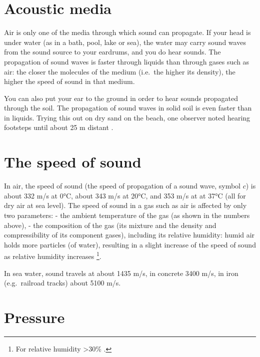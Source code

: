 \documentclass[
]{book}
\begin{document}
\section{Acoustic media}\label{acoustic-media}

Air is only one of the media through which sound can propagate. If your head is under water (as in a bath, pool, lake or sea), the water may carry sound waves from the sound source to your eardrums, and you do hear sounds. The propagation of sound waves is faster through liquids than through gases such as air: the closer the molecules of the medium (i.e.~the higher its density), the higher the speed of sound in that medium.

You can also put your ear to the ground in order to hear sounds propagated through the soil. The propagation of sound waves in solid soil is even faster than in liquids. Trying this out on dry sand on the beach, one observer noted hearing footsteps until about 25 m distant \citep[§10]{Minnaert_1970v2}.

\section{The speed of sound}\label{sec:speedofsound}

In air, the speed of sound (the speed of propagation of a sound wave, symbol \(c\)) is about 332 m/s at 0°C, about 343 m/s at 20°C, and 353 m/s at at 37°C \citep{Shadle_2010} (all for dry air at sea level).
The speed of sound in a gas such as air is affected by only two parameters:
- the ambient temperature of the gas (as shown in the numbers above),
- the composition of the gas (its mixture and the density and compressibility of its component gases), including its relative humidity: humid air holds more particles (of water), resulting in a slight increase of the speed of sound as relative humidity increases \citep{Harris_1971}\footnote{For relative humidity \textgreater30\% \citep{Harris_1971}.}.

In sea water, sound travels at about 1435 m/s, in concrete 3400 m/s, in iron (e.g.~railroad tracks) about 5100 m/s.

\section{Pressure}\label{sec:pressure}
\end{document}
